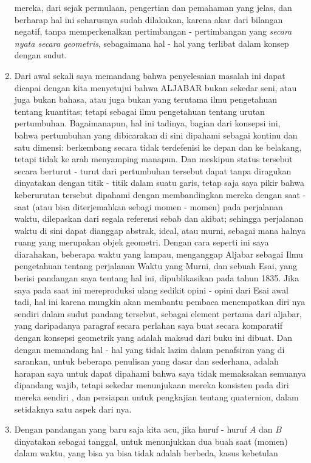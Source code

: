 \documentclass[a4paper, 12pt]{book}
\begin{document}
\begin{enumerate}
mereka, dari sejak permulaan, pengertian dan pemahaman yang jelas, dan berharap
hal ini seharusnya sudah dilakukan, karena akar dari bilangan negatif, tanpa
memperkenalkan pertimbangan - pertimbangan yang 
\textit{secara nyata secara geometris}, 
sebagaimana hal - hal yang terlibat dalam konsep dengan sudut.
\item Dari awal sekali saya memandang bahwa penyelesaian masalah ini dapat 
dicapai dengan kita menyetujui bahwa ALJABAR bukan sekedar seni, atau juga 
bukan bahasa, atau juga bukan yang terutama ilmu pengetahuan tentang kuantitas;
tetapi sebagai ilmu pengetahuan tentang urutan pertumbuhan. Bagaimanapun, hal
ini tadinya, bagian dari konsepsi ini, bahwa pertumbuhan yang dibicarakan 
di sini dipahami sebagai kontinu dan satu dimensi: berkembang secara tidak 
terdefenisi ke depan dan ke belakang, tetapi tidak ke arah menyamping manapun.
Dan meskipun status tersebut secara berturut - turut dari pertumbuhan tersebut
dapat tanpa diragukan dinyatakan dengan titik - titik dalam suatu garis, tetap
saja saya pikir bahwa keberurutan tersebut dipahami dengan membandingkan mereka
dengan saat - saat (atau bisa diterjemahkan sebagi momen - momen) pada 
perjalanan waktu, dilepaskan dari segala referensi
sebab dan akibat; sehingga perjalanan waktu di sini dapat dianggap abstrak, 
ideal, atau murni, sebagai mana halnya ruang yang merupakan objek geometri.
Dengan cara seperti ini saya diarahakan, beberapa waktu yang lampau, 
menganggap Aljabar sebagai Ilmu pengetahuan tentang perjalanan Waktu yang Murni,
dan sebuah Esai, yang berisi pandangan saya tentang hal ini, dipublikasikan
pada tahun 1835. Jika saya pada saat ini mereproduksi ulang sedikit opini
- opini dari Esai awal tadi, hal ini karena mungkin akan membantu pembaca 
menempatkan diri nya sendiri dalam sudut pandang tersebut, sebagai element
pertama dari aljabar, yang daripadanya paragraf secara perlahan saya buat 
secara komparatif dengan  konsepsi geometrik yang adalah maksud dari buku
ini dibuat. Dan dengan memandang hal - hal yang tidak lazim dalam penafsiran
yang di sarankan, untuk beberapa penulisan yang dasar dan sederhana, adalah
harapan saya untuk dapat dipahami bahwa saya tidak memaksakan semuanya 
dipandang wajib, tetapi sekedar menunjukaan mereka konsisten pada diri mereka
sendiri , dan persiapan untuk pengkajian tentang quaternion, dalam setidaknya
satu aspek dari nya.
\item Dengan pandangan yang baru saja kita acu, jika huruf - huruf $A$ dan
$B$ dinyatakan sebagai tanggal, untuk menunjukkan dua buah saat 
(momen) dalam waktu, yang bisa ya bisa tidak adalah berbeda, kasus kebetulan 

\end{enumerate}
\end{document}
